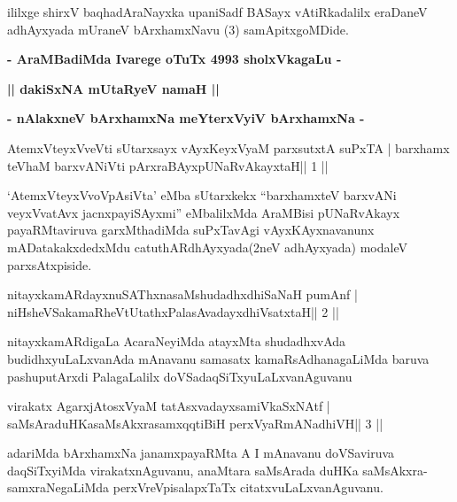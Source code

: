 \begin{center}
ililxge shirxV baqhadAraNayxka upaniSadf BASayx vAtiRkadalilx eraDaneV
adhAyxyada mUraneV bArxhamxNavu (3) samApitxgoMDide.
\end{center}

\begin{center}
\textbf{- AraMBadiMda Ivarege oTuTx 4993 sholxVkagaLu -}
\end{center}

\begin{center}
\textbf{|| dakiSxNA mUtaRyeV namaH ||}

\textbf{- nAlakxneV bArxhamxNa meYterxVyiV bArxhamxNa -}
\end{center}

\begin{shl}
AtemxVteyxVveVti sUtarxsayx vAyxKeyxVyaM parxsutxtA suPxTA |
barxhamx teV\s haM barxvANiVti pArxraBAyx\s\s pUNaRvAkayxtaH\hfill || 1 ||
\end{shl}

\begin{artha}
`AtemxVteyxVvoVpAsiVta' eMba sUtarxkekx ``barxhamxteV barxvANi   veyxVvatAvx jacnxpayiSAyxmi'' eMbalilxMda AraMBisi pUNaRvAkayx   payaRMtaviruva garxMthadiMda suPxTavAgi vAyxKAyxnavanunx   mADatakakxdedxMdu catuthARdhAyxyada(2neV adhAyxyada) modaleV   parxsAtxpiside.
\end{artha}


\begin{shl}
nitayxkamARdayxnuSAThxnasaMshudadhxdhiSaNaH pumAnf |
niHsheVSakamaRheVtUtathxPalasAvadayxdhiVsatxtaH\hfill || 2 ||
\end{shl}

\begin{artha}
nitayxkamARdigaLa AcaraNeyiMda atayxMta shudadhxvAda
budidhxyuLaLxvanAda mAnavanu samasatx kamaRsAdhanagaLiMda baruva
pashuputArxdi PalagaLalilx doVSadaqSiTxyuLaLxvanAguvanu 
\end{artha}

\begin{shl}
virakatx AgarxjAtosxV\s yaM tatAsxvadayxsamiVkaSxNAtf |
saMsAraduHKasaMsAkxrasamxqqtiBiH perxVyaRmANadhiVH\hfill || 3 ||
\end{shl}

\begin{artha}
adariMda bArxhamxNa janamxpayaRMta A I mAnavanu doVSaviruva
daqSiTxyiMda virakatxnAguvanu, anaMtara saMsArada duHKa
saMsAkxra-samxraNegaLiMda perxVreVpisalapxTaTx citatxvuLaLxvanAguvanu. 
\end{artha}


